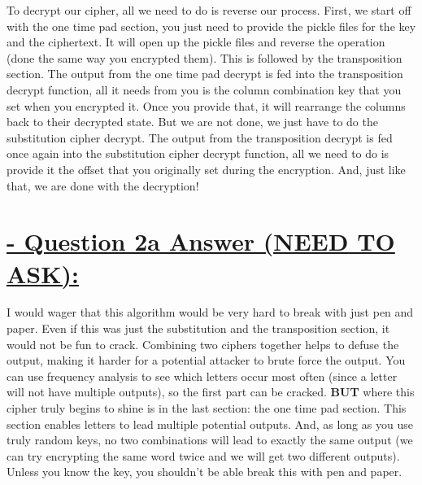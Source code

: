 \documentclass{article}
\begin{document}
\newline
To decrypt our cipher, all we need to do is reverse our process. First, we start off with the one time pad section, you just need to provide the pickle files for the key and the ciphertext. It will open up the pickle files and reverse the operation (done the same way you encrypted them). This is followed by the transposition section. The output from the one time pad decrypt is fed into the transposition decrypt function, all it needs from you is the column combination key that you set when you encrypted it. Once you provide that, it will rearrange the columns back to their decrypted state. But we are not done, we just have to do the substitution cipher decrypt. The output from the transposition decrypt is fed once again into the substitution cipher decrypt function, all we need to do is provide it the offset that you originally set during the encryption. And, just like that, we are done with the decryption!
\section{\underline{ - Question 2a Answer (NEED TO ASK):}}
I would wager that this algorithm would be very hard to break with just pen and paper. Even if this was just the substitution and the transposition section, it would not be fun to crack. Combining two ciphers together helps to defuse the output, making it harder for a potential attacker to brute force the output. You can use frequency analysis to see which letters occur most often (since a letter will not have multiple outputs), so the first part can be cracked. \newline
\textbf{BUT} where this cipher truly begins to shine is in the last section: the one time pad section. This section enables letters to lead multiple potential outputs. And, as long as you use truly random keys, no two combinations will lead to exactly the same output (we can try encrypting the same word twice and we will get two different outputs). Unless you know the key, you shouldn't be able break this with pen and paper. 
\end{document}
